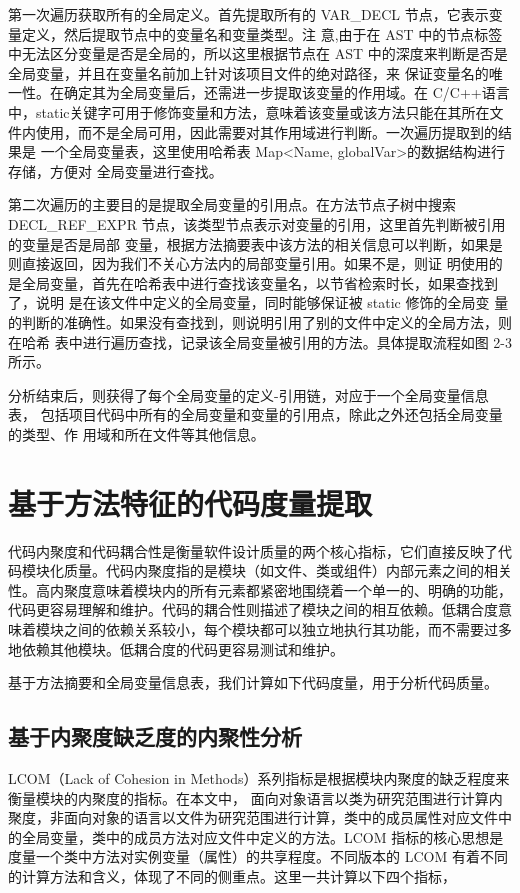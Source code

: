 第一次遍历获取所有的全局定义。首先提取所有的
VAR\_DECL 节点，它表示变量定义，然后提取节点中的变量名和变量类型。注
意,由于在 AST 中的节点标签中无法区分变量是否是全局的，所以这里根据节点在 AST
中的深度来判断是否是全局变量，并且在变量名前加上针对该项目文件的绝对路径，来
保证变量名的唯一性。在确定其为全局变量后，还需进一步提取该变量的作用域。在
C/C++语言中，static关键字可用于修饰变量和方法，意味着该变量或该方法只能在其所在文
件内使用，而不是全局可用，因此需要对其作用域进行判断。一次遍历提取到的结果是
一个全局变量表，这里使用哈希表 Map<Name, globalVar>的数据结构进行存储，方便对
全局变量进行查找。

第二次遍历的主要目的是提取全局变量的引用点。在方法节点子树中搜索
DECL\_REF\_EXPR 节点，该类型节点表示对变量的引用，这里首先判断被引用的变量是否是局部
变量，根据方法摘要表中该方法的相关信息可以判断，如果是则直接返回，因为我们不关心方法内的局部变量引用。如果不是，则证
明使用的是全局变量，首先在哈希表中进行查找该变量名，以节省检索时长，如果查找到了，说明
是在该文件中定义的全局变量，同时能够保证被 static 修饰的全局变
量的判断的准确性。如果没有查找到，则说明引用了别的文件中定义的全局方法，则在哈希
表中进行遍历查找，记录该全局变量被引用的方法。具体提取流程如图 2-3 所示。

分析结束后，则获得了每个全局变量的定义-引用链，对应于一个全局变量信息表，
包括项目代码中所有的全局变量和变量的引用点，除此之外还包括全局变量的类型、作
用域和所在文件等其他信息。

\section{基于方法特征的代码度量提取}

代码内聚度和代码耦合性是衡量软件设计质量的两个核心指标，它们直接反映了代
码模块化质量。代码内聚度指的是模块（如文件、类或组件）内部元素之间的相关性。高内聚度意味着模块内的所有元素都紧密地围绕着一个单一的、明确的功能，代码更容易理解和维护\cite{2014Service}。代码的耦合性则描述了模块之间的相互依赖。低耦合度意味着模块之间的依赖关系较小，每个模块都可以独立地执行其功能，而不需要过多地依赖其他模块。低耦合度的代码更容易测试和维护\cite{2013Ahe}。


基于方法摘要和全局变量信息表，我们计算如下代码度量，用于分析代码质量。


\subsection{基于内聚度缺乏度的内聚性分析}

LCOM（Lack of Cohesion in Methods）系列指标是根据模块内聚度的缺乏程度来衡量模块的内聚度的指标。在本文中，
面向对象语言以类为研究范围进行计算内聚度，非面向对象的语言以文件为研究范围进行计算，类中的成员属性对应文件中的全局变量，类中的成员方法对应文件中定义的方法。LCOM 指标的核心思想是度量一个类中方法对实例变量（属性）的共享程度。不同版本的 LCOM 有着不同的计算方法和含义，体现了不同的侧重点。这里一共计算以下四个指标，

